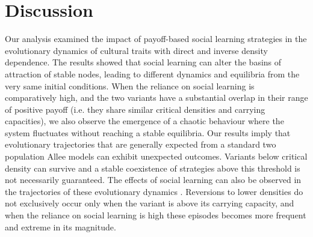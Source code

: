 \documentclass[review,authoryear]{elsarticle}
\begin{document}


\section{Discussion}



Our analysis examined the impact of payoff-based social learning strategies in the evolutionary dynamics of cultural traits with direct and inverse density dependence. The results showed that social learning can alter the basins of attraction of stable nodes, leading to different dynamics and equilibria from the very same initial conditions. When the reliance on social learning is comparatively high, and  the two variants have a substantial overlap in their range of positive payoff (i.e. they share similar critical densities and carrying capacities), we also observe the emergence of a chaotic behaviour where the system fluctuates without reaching a stable equilibria. Our results imply that evolutionary trajectories that are generally expected from a standard two population Allee models can exhibit unexpected outcomes. Variants below critical density can survive and a stable coexistence of strategies above this threshold is not necessarily guaranteed. The effects of social learning can also be observed in the trajectories of these evolutionary dynamics . Reversions to lower densities do not exclusively occur only when the variant is above its carrying capacity, and when the reliance on social learning is high these episodes becomes more frequent and extreme in its magnitude. 

\end{document}
